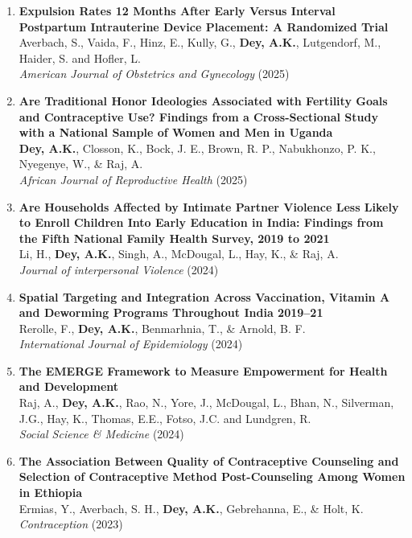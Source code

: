 \documentclass[11pt,letterpaper]{article}
\begin{document}
\begin{enumerate}
\item \textbf{Expulsion Rates 12 Months After Early Versus Interval Postpartum Intrauterine Device Placement: A Randomized Trial}
Averbach, S., Vaida, F., Hinz, E., Kully, G., \textbf{Dey, A.K.}, Lutgendorf, M., Haider, S. and Hofler, L. \\
\emph{American Journal of Obstetrics and Gynecology} (2025) 

\item \textbf{Are Traditional Honor Ideologies Associated with Fertility Goals and Contraceptive Use? Findings from a Cross-Sectional Study with a National Sample of Women and Men in Uganda}\\
\textbf{Dey, A.K.}, Closson, K., Bock, J. E., Brown, R. P., Nabukhonzo, P. K., Nyegenye, W., \& Raj, A.\\
\emph{African Journal of Reproductive Health} (2025) 

\item \textbf{Are Households Affected by Intimate Partner Violence Less Likely to Enroll Children Into Early Education in India: Findings from the Fifth National Family Health Survey, 2019 to 2021}\\
Li, H., \textbf{Dey, A.K.}, Singh, A., McDougal, L., Hay, K., \& Raj, A.\\
\emph{Journal of interpersonal Violence} (2024) 

\item \textbf{Spatial Targeting and Integration Across Vaccination, Vitamin A and Deworming Programs Throughout India 2019–21}\\
Rerolle, F., \textbf{Dey, A.K.}, Benmarhnia, T., \& Arnold, B. F.\\
\emph{International Journal of Epidemiology} (2024) 

\item \textbf{The EMERGE Framework to Measure Empowerment for Health and Development}\\
Raj, A., \textbf{Dey, A.K.}, Rao, N., Yore, J., McDougal, L., Bhan, N., Silverman, J.G., Hay, K., Thomas, E.E., Fotso, J.C. and Lundgren, R.\\
\emph{Social Science \& Medicine} (2024) 

\item \textbf{The Association Between Quality of Contraceptive Counseling and Selection of Contraceptive Method Post-Counseling Among Women in Ethiopia}\\
Ermias, Y., Averbach, S. H., \textbf{Dey, A.K.}, Gebrehanna, E., \& Holt, K.\\
\emph{Contraception} (2023) 


\end{enumerate}
\end{document}

